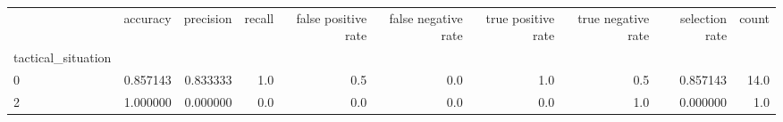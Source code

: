 \begin{tabular}{lrrrrrrrrr}
\toprule
{} &  accuracy &  precision &  recall &  false positive rate &  false negative rate &  true positive rate &  true negative rate &  selection rate &  count \\
tactical\_situation &           &            &         &                      &                      &                     &                     &                 &        \\
\midrule
0                  &  0.857143 &   0.833333 &     1.0 &                  0.5 &                  0.0 &                 1.0 &                 0.5 &        0.857143 &   14.0 \\
2                  &  1.000000 &   0.000000 &     0.0 &                  0.0 &                  0.0 &                 0.0 &                 1.0 &        0.000000 &    1.0 \\
\bottomrule
\end{tabular}
